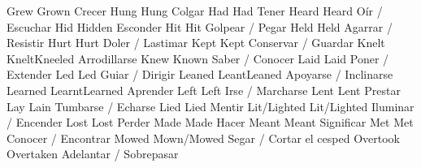 	            {Grew}{}	            {Grown}{}               {Crecer}{}
	            {Hung}{}	            {Hung}{}                {Colgar}{}
	            {Had}{}	                {Had}{}                 {Tener}{}
	            {Heard}{}	            {Heard}{}               {Oír / Escuchar}{}
	            {Hid}{}	                {Hidden}{}              {Esconder}{}
	            {Hit}{}	                {Hit}{}                 {Golpear / Pegar}{}
	            {Held}{}	            {Held}{}                {Agarrar / Resistir}{}
	            {Hurt}{}	            {Hurt}{}                {Doler / Lastimar}{}
	            {Kept}{}	            {Kept}{}                {Conservar / Guardar}{}
	            {Knelt}{}	            {Knelt}{Kneeled}        {Arrodillarse}{}
	            {Knew}{}	            {Known}{}               {Saber / Conocer}{}
	            {Laid}{}	            {Laid}{}                {Poner / Extender}{}
	            {Led}{}	                {Led}{}                 {Guiar / Dirigir}{}
	            {Leaned}{}	            {Leant}{Leaned}         {Apoyarse / Inclinarse}{}
	            {Learned}{}	            {Learnt}{Learned}       {Aprender}{}
	            {Left}{}	            {Left}{}                {Irse / Marcharse}{}
	            {Lent}{}	            {Lent}{}                {Prestar}{}
	            {Lay}{}	                {Lain}{}                {Tumbarse / Echarse}{}
	            {Lied}{}	            {Lied}{}                {Mentir}{}
	            {Lit/Lighted}{}	        {Lit/Lighted}{}         {Iluminar / Encender}{}
	            {Lost}{}	            {Lost}{}                {Perder}{}
	            {Made}{}	            {Made}{}                {Hacer}{}
	            {Meant}{}	            {Meant}{}               {Significar}{}
	            {Met}{}	                {Met}{}                 {Conocer / Encontrar}{}
	            {Mowed}{}	            {Mown/Mowed}{}          {Segar / Cortar el cesped}{}
	        {Overtook}{}	        {Overtaken}{}           {Adelantar / Sobrepasar}{}
